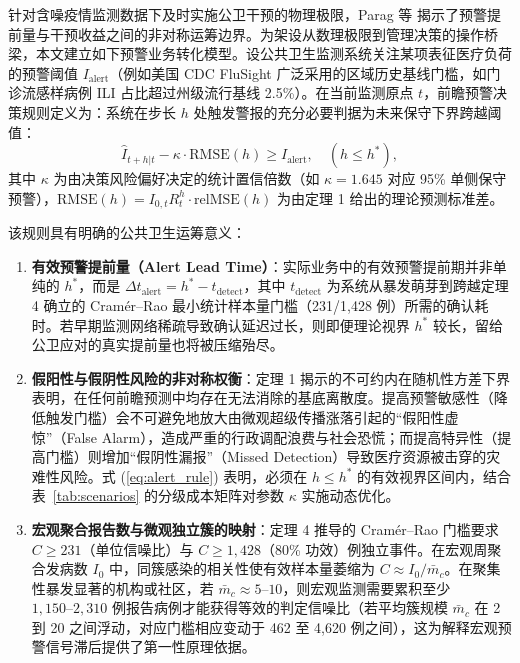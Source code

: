 \documentclass[11pt,a4paper]{article}
\theoremstyle{plain}
\theoremstyle{definition}
\begin{document}
针对含噪疫情监测数据下及时实施公卫干预的物理极限，Parag 等\citep{parag2025asymmetric} 揭示了预警提前量与干预收益之间的非对称运筹边界。为架设从数理极限到管理决策的操作桥梁，本文建立如下预警业务转化模型。设公共卫生监测系统关注某项表征医疗负荷的预警阈值 $I_{\text{alert}}$（例如美国 CDC FluSight 广泛采用的区域历史基线门槛，如门诊流感样病例 ILI 占比超过州级流行基线 2.5\%）。在当前监测原点 $t$，前瞻预警决策规则定义为：系统在步长 $h$ 处触发警报的充分必要判据为未来保守下界跨越阈值：
\begin{equation}
\hat{I}_{t+h|t} - \kappa \cdot \text{RMSE}(h) \ge I_{\text{alert}}, \quad (h \le h^*),
\label{eq:alert_rule}
\end{equation}
其中 $\kappa$ 为由决策风险偏好决定的统计置信倍数（如 $\kappa = 1.645$ 对应 95\% 单侧保守预警），$\text{RMSE}(h) = I_{0,t} R_t^h \cdot \text{relMSE}(h)$ 为由定理 1 给出的理论预测标准差。

该规则具有明确的公共卫生运筹意义：
\begin{enumerate}
\item \textbf{有效预警提前量（Alert Lead Time）}：实际业务中的有效预警提前期并非单纯的 $h^*$，而是 $\Delta t_{\text{alert}} = h^* - t_{\text{detect}}$，其中 $t_{\text{detect}}$ 为系统从暴发萌芽到跨越定理 4 确立的 Cram\'er--Rao 最小统计样本量门槛（231/1,428 例）所需的确认耗时。若早期监测网络稀疏导致确认延迟过长，则即便理论视界 $h^*$ 较长，留给公卫应对的真实提前量也将被压缩殆尽。
\item \textbf{假阳性与假阴性风险的非对称权衡}：定理 1 揭示的不可约内在随机性方差下界表明，在任何前瞻预测中均存在无法消除的基底离散度。提高预警敏感性（降低触发门槛）会不可避免地放大由微观超级传播涨落引起的“假阳性虚惊”（False Alarm），造成严重的行政调配浪费与社会恐慌；而提高特异性（提高门槛）则增加“假阴性漏报”（Missed Detection）导致医疗资源被击穿的灾难性风险。式 (\ref{eq:alert_rule}) 表明，必须在 $h \le h^*$ 的有效视界区间内，结合表~\ref{tab:scenarios} 的分级成本矩阵对参数 $\kappa$ 实施动态优化。
\item \textbf{宏观聚合报告数与微观独立簇的映射}：定理 4 推导的 Cram\'er--Rao 门槛要求 $C \ge 231$（单位信噪比）与 $C \ge 1,428$（80\% 功效）例独立事件。在宏观周聚合发病数 $I_0$ 中，同簇感染的相关性使有效样本量萎缩为 $C \approx I_0 / \bar{m}_c$。在聚集性暴发显著的机构或社区，若 $\bar{m}_c \approx 5\text{--}10$，则宏观监测需要累积至少 $1,150\text{--}2,310$ 例报告病例才能获得等效的判定信噪比（若平均簇规模 $\bar{m}_c$ 在 2 到 20 之间浮动，对应门槛相应变动于 462 至 4,620 例之间），这为解释宏观预警信号滞后提供了第一性原理依据。
\end{enumerate}
\end{document}
